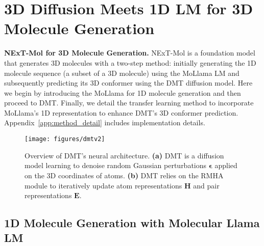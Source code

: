 \section{3D Diffusion Meets 1D LM for 3D Molecule Generation}
\textbf{NExT-Mol for 3D Molecule Generation.} NExT-Mol is a foundation model that generates 3D molecules with a two-step method: initially generating the 1D molecule sequence (a subset of a 3D molecule) using the MoLlama LM and subsequently predicting its 3D conformer using the DMT diffusion model.
Here we begin by introducing the MoLlama for 1D molecule generation and then proceed to DMT. Finally, we detail the transfer learning method to incorporate MoLlama's 1D representation to enhance DMT's 3D conformer prediction. Appendix~\ref{app:method_detail} includes implementation details.

\begin{figure}[t]
\centering
\texttt{[image: figures/dmtv2]}
\vspace{-5mm}
\caption{Overview of DMT's neural architecture. \textbf{(a)} DMT is a diffusion model learning to denoise random Gaussian perturbations $\boldsymbol{\epsilon}$ applied on the 3D coordinates of atoms. \textbf{(b)} DMT relies on the RMHA module to iteratively update atom representations $\mathbf{H}$ and pair representations $\mathbf{E}$.}
\label{fig:dmt}
\vspace{-6mm}
\end{figure}

\vspace{-1mm}
\subsection{1D Molecule Generation with Molecular Llama LM}\label{sec:1d-generation}
\vspace{-1mm}


